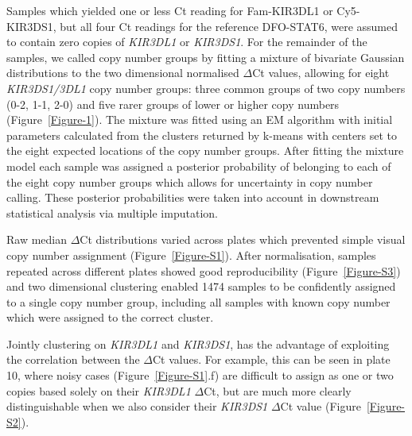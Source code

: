 Samples which yielded one or less Ct reading for Fam-KIR3DL1 or
Cy5-KIR3DS1, but all four Ct readings for the reference DFO-STAT6,
were assumed to contain zero copies of \emph{KIR3DL1} or
\emph{KIR3DS1}.  For the remainder of the samples, we called copy number groups
by fitting a mixture of bivariate Gaussian distributions to the two
dimensional normalised $\Delta$Ct values, allowing for eight
\emph{KIR3DS1/3DL1} copy number groups: three common groups of two copy
numbers (0-2, 1-1, 2-0) and five
rarer groups of lower or higher copy numbers
(Figure~\ref{Figure-1}).  The mixture was fitted using
an EM algorithm \citep{Young:2009ty} with initial parameters
calculated from the clusters returned by k-means with centers set to
the eight expected locations of the copy number groups.
After fitting the mixture model each sample was assigned a posterior
probability of belonging to each of the eight copy number groups which
allows for uncertainty in copy number calling.  These posterior
probabilities were taken into account in downstream statistical
analysis via multiple imputation.

Raw median $\Delta$Ct distributions varied across plates which prevented simple visual copy number assignment (Figure~\ref{Figure-S1}).
After normalisation, samples repeated across different plates showed good reproducibility (Figure~\ref{Figure-S3}) and two dimensional clustering enabled 1474 samples to be confidently assigned to a single copy number group, including all samples with known copy number which were assigned to the correct cluster.

Jointly clustering on \emph{KIR3DL1} and \emph{KIR3DS1}, has the advantage of exploiting the correlation between the $\Delta$Ct values. 
For example, this can be seen in plate 10, where noisy cases (Figure~\ref{Figure-S1}.f) are difficult to assign as one or two copies based solely on their \emph{KIR3DL1} $\Delta$Ct, but are much more clearly distinguishable when we also consider their \emph{KIR3DS1} $\Delta$Ct value (Figure~\ref{Figure-S2}).



